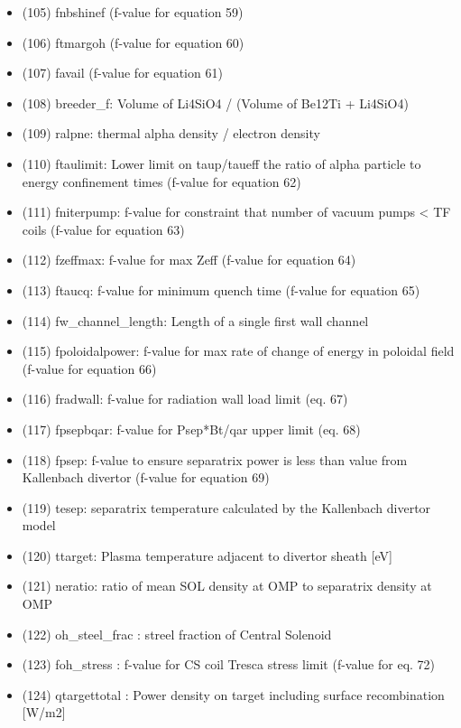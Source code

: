 \documentclass[]{article}
\begin{document}
\begin{itemize}
\begin{itemize}
    (104) fcwr (f-value for equation 23)
  \item
    (105) fnbshinef (f-value for equation 59)
  \item
    (106) ftmargoh (f-value for equation 60)
  \item
    (107) favail (f-value for equation 61)
  \item
    (108) breeder\_f: Volume of Li4SiO4 / (Volume of Be12Ti + Li4SiO4)
  \item
    (109) ralpne: thermal alpha density / electron density
  \item
    (110) ftaulimit: Lower limit on taup/taueff the ratio of alpha
    particle to energy confinement times (f-value for equation 62)
  \item
    (111) fniterpump: f-value for constraint that number of vacuum pumps
    \textless{} TF coils (f-value for equation 63)
  \item
    (112) fzeffmax: f-value for max Zeff (f-value for equation 64)
  \item
    (113) ftaucq: f-value for minimum quench time (f-value for equation
    65)
  \item
    (114) fw\_channel\_length: Length of a single first wall channel
  \item
    (115) fpoloidalpower: f-value for max rate of change of energy in
    poloidal field (f-value for equation 66)
  \item
    (116) fradwall: f-value for radiation wall load limit (eq. 67)
  \item
    (117) fpsepbqar: f-value for Psep*Bt/qar upper limit (eq. 68)
  \item
    (118) fpsep: f-value to ensure separatrix power is less than value
    from Kallenbach divertor (f-value for equation 69)
  \item
    (119) tesep: separatrix temperature calculated by the Kallenbach
    divertor model
  \item
    (120) ttarget: Plasma temperature adjacent to divertor sheath
    {[}eV{]}
  \item
    (121) neratio: ratio of mean SOL density at OMP to separatrix
    density at OMP
  \item
    (122) oh\_steel\_frac : streel fraction of Central Solenoid
  \item
    (123) foh\_stress : f-value for CS coil Tresca stress limit (f-value
    for eq. 72)
  \item
    (124) qtargettotal : Power density on target including surface
    recombination {[}W/m2{]}

\end{itemize}
\end{itemize}
\end{document}

